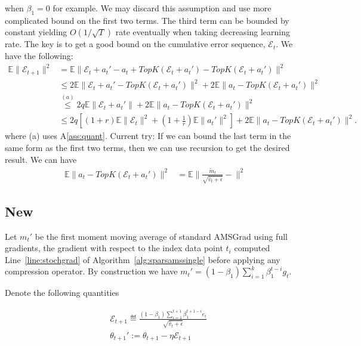 \documentclass[11pt]{article}
\begin{document}
when $\beta_1=0$ for example. We may discard this assumption and use more complicated bound on the first two terms. The third term can be bounded by constant yielding $O(1/\sqrt T)$ rate eventually when taking decreasing learning rate. The key is to get a good bound on the cumulative error sequence, $\mathcal E_t$. We have the following:
\begin{align*}
    \mathbb E\|\mathcal E_{t+1}\|^2&=\mathbb E\|\mathcal E_t+a_t'-a_t+TopK(\mathcal E_t+a_t')-TopK(\mathcal E_t+a_t')\|^2\\
    &\leq 2\mathbb E\|\mathcal E_t+a_t'-TopK(\mathcal E_t+a_t')\|^2+2\mathbb E\|a_t-TopK(\mathcal E_t+a_t')\|^2\\
    & \overset{(a)}{\leq} 2q\mathbb E\|\mathcal E_t+a_t'\|+2\mathbb E\|a_t-TopK(\mathcal E_t+a_t')\|^2\\
    &\leq 2q[(1+r)\mathbb E\|\mathcal E_t\|^2+(1+\frac{1}{r})\mathbb E\|a_t'\|^2]+2\mathbb E\|a_t-TopK(\mathcal E_t+a_t')\|^2.
\end{align*}
where (a) uses A\ref{ass:quant}.
Current try: If we can bound the last term in the same form as the first two terms, then we can use recursion to get the desired result. We can have
\begin{align*}
    \mathbb E\|a_t-TopK(\mathcal E_t+a_t')\|^2&=\mathbb E\| \frac{\tilde m_t}{\sqrt{\hat v_t+\epsilon}}- \|^2
\end{align*}

\subsection{New}



Let $m_t'$ be the first moment moving average of standard AMSGrad using full gradients, \ie the gradient with respect to the index data point $t_i$ computed Line~\ref{line:stochgrad} of Algorithm~\ref{alg:sparsamssingle} before applying any compression operator.
By construction we have $m_t'=(1-\beta_1)\sum_{i=1}^k\beta_1^{t-i} g_t$. 

Denote the following quantities

\begin{align*}
& \mathcal E_{t+1}\eqdef \frac{(1-\beta_1)\sum_{i=1}^{t+1} \beta_1^{t+1-i} e_i}{\sqrt{\hat v_t+\epsilon}}\\
&\theta_{t+1}':=\theta_{t+1}-\eta\mathcal E_{t+1}
\end{align*}
\end{document}
